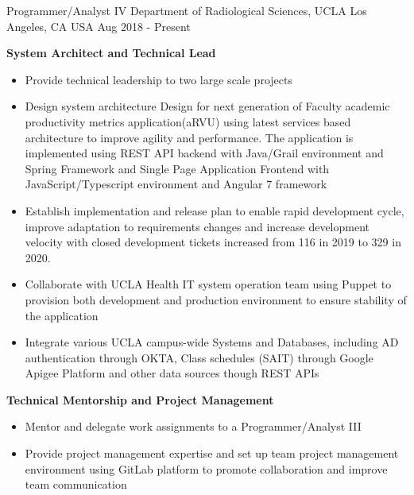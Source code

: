 


\begin{cventries}


	
  \cventry
    {Programmer/Analyst IV} %
    {Department of Radiological Sciences, UCLA} %
    {Los Angeles, CA USA} %
    {Aug 2018 - Present} %
    {
      \begin{cvitems} %
        \item[] { {\bf System Architect and Technical Lead}
            \begin{itemize} %
                \item {Provide technical leadership to two large scale projects}
                \item {Design system architecture Design for next generation of Faculty academic productivity metrics application(aRVU) using latest services based architecture to improve agility and performance. The application is implemented using REST API backend with Java/Grail environment and Spring Framework and Single Page Application Frontend with JavaScript/Typescript environment and Angular 7 framework}
                \item {Establish implementation and release plan to enable rapid development cycle, improve adaptation to requirements changes and increase development velocity with closed development tickets increased from 116 in 2019 to 329 in 2020.}
                \item {Collaborate with UCLA Health IT system operation team using Puppet to provision both development and production environment to ensure stability of the application}
                \item {Integrate various UCLA campus-wide Systems and Databases, including AD authentication through OKTA, Class schedules (SAIT) through Google Apigee Platform and other data sources though REST APIs}
              \end{itemize}}
        \item[] { {\bf Technical Mentorship and Project Management} 
            \begin{itemize} %
                \item {Mentor and delegate work assignments to a Programmer/Analyst III}
                \item {Provide project management expertise and set up team project management environment using GitLab platform to promote collaboration and improve team communication}
              \end{itemize}}
      \end{cvitems}
    }



\end{cventries}
